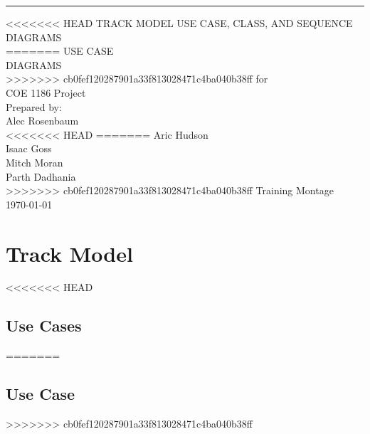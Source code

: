 \documentclass{scrreprt}
\begin{document}
\begin{flushright}
    \rule{16cm}{5pt}\vskip1cm
    \begin{bfseries}
<<<<<<< HEAD
        \Huge{TRACK MODEL USE CASE, CLASS, AND SEQUENCE DIAGRAMS}\\
=======
        \Huge{USE CASE\\DIAGRAMS}\\
>>>>>>> cb0fef120287901a33f813028471c4ba040b38ff
        \vspace{.9cm}
        for\\
        \vspace{.9cm}
        COE 1186 Project\\
        \vspace{.9cm}
        \vspace{.9cm}
        Prepared by:\\
        Alec Rosenbaum\\
<<<<<<< HEAD
        \vspace{4.9cm}
=======
        Aric Hudson\\
        Isaac Goss\\
        Mitch Moran\\
        Parth Dadhania\\
        \vspace{1.9cm}
>>>>>>> cb0fef120287901a33f813028471c4ba040b38ff
        Training Montage\\
        \vspace{.9cm}
        \today\\
    \end{bfseries}
\end{flushright}

\tableofcontents

\chapter{Track Model}

<<<<<<< HEAD
\section{Use Cases}
=======
\section{Use Case}
>>>>>>> cb0fef120287901a33f813028471c4ba040b38ff
\end{document}
